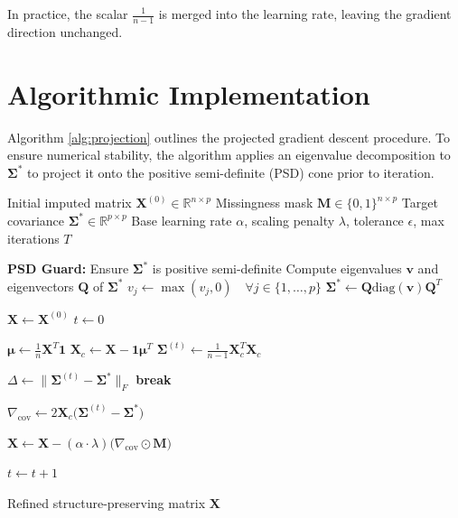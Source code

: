 \documentclass[11pt]{article}
\begin{document}
In practice, the scalar $\frac{1}{n-1}$ is merged into the learning rate, leaving the gradient direction unchanged.

\section{Algorithmic Implementation}
Algorithm \ref{alg:projection} outlines the projected gradient descent procedure. To ensure numerical stability, the algorithm applies an eigenvalue decomposition to $\bm{\Sigma}^*$ to project it onto the positive semi-definite (PSD) cone prior to iteration.

\begin{algorithm}[H]
\caption{Masked Covariance Projection via Gradient Descent}
\label{alg:projection}
\begin{algorithmic}[1]
\Require Initial imputed matrix $\bm{X}^{(0)} \in \mathbb{R}^{n \times p}$
\Require Missingness mask $\bm{M} \in \{0, 1\}^{n \times p}$
\Require Target covariance $\bm{\Sigma}^* \in \mathbb{R}^{p \times p}$
\Require Base learning rate $\alpha$, scaling penalty $\lambda$, tolerance $\epsilon$, max iterations $T$

\State \textbf{PSD Guard:} Ensure $\bm{\Sigma}^*$ is positive semi-definite
\State Compute eigenvalues $\bm{v}$ and eigenvectors $\bm{Q}$ of $\bm{\Sigma}^*$
    \State $v_j \leftarrow \max(v_j, 0) \quad \forall j \in \{1, \dots, p\}$
    \State $\bm{\Sigma}^* \leftarrow \bm{Q} \text{diag}(\bm{v}) \bm{Q}^T$
\EndIf

\State $\bm{X} \leftarrow \bm{X}^{(0)}$
\State $t \leftarrow 0$

    \State $\bm{\mu} \leftarrow \frac{1}{n} \bm{X}^T \bm{1}$ 
    \State $\bm{X}_c \leftarrow \bm{X} - \bm{1}\bm{\mu}^T$ 
    \State $\bm{\Sigma}^{(t)} \leftarrow \frac{1}{n-1} \bm{X}_c^T \bm{X}_c$ 
    
    \State $\Delta \leftarrow \big\| \bm{\Sigma}^{(t)} - \bm{\Sigma}^* \big\|_F$ 
    \If{$\Delta < \epsilon$}
        \State \textbf{break} 
    \EndIf
    
    \State $\nabla_{\text{cov}} \leftarrow 2 \bm{X}_c \big(\bm{\Sigma}^{(t)} - \bm{\Sigma}^*\big)$ 
    
    \State $\bm{X} \leftarrow \bm{X} - (\alpha \cdot \lambda) \big( \nabla_{\text{cov}} \odot \bm{M} \big)$ 
    
    \State $t \leftarrow t + 1$
\EndWhile

\Ensure Refined structure-preserving matrix $\bm{X}$
\end{algorithmic}
\end{algorithm}
\end{document}
